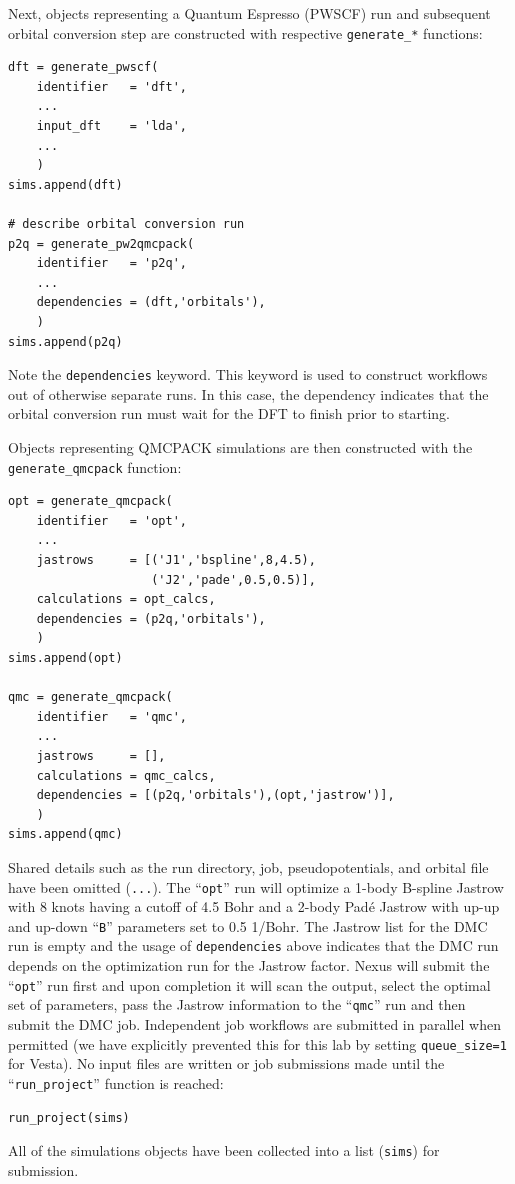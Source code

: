 Next, objects representing a Quantum Espresso (PWSCF) run and subsequent orbital conversion step are constructed with respective \texttt{generate\_*} functions:
\begin{lstlisting}
dft = generate_pwscf(
    identifier   = 'dft',
    ...
    input_dft    = 'lda',
    ...
    )
sims.append(dft)

# describe orbital conversion run                                                                    
p2q = generate_pw2qmcpack(
    identifier   = 'p2q',
    ...
    dependencies = (dft,'orbitals'),
    )
sims.append(p2q)
\end{lstlisting}
Note the \texttt{dependencies} keyword.  This keyword is used to construct workflows out of otherwise separate runs.  In this case, the dependency indicates that the orbital conversion run must wait for the DFT to finish prior to starting.

Objects representing QMCPACK simulations are then constructed with the \texttt{generate\_qmcpack} function:
\begin{lstlisting}
opt = generate_qmcpack(
    identifier   = 'opt',
    ...
    jastrows     = [('J1','bspline',8,4.5), 
                    ('J2','pade',0.5,0.5)],
    calculations = opt_calcs,
    dependencies = (p2q,'orbitals'),
    )
sims.append(opt)

qmc = generate_qmcpack(
    identifier   = 'qmc',
    ...
    jastrows     = [],            
    calculations = qmc_calcs,
    dependencies = [(p2q,'orbitals'),(opt,'jastrow')],
    )
sims.append(qmc)
\end{lstlisting}
\noindent
Shared details such as the run directory, job, pseudopotentials, and orbital file have been omitted (\texttt{...}).  The ``\texttt{opt}'' run will optimize a 1-body B-spline Jastrow with 8 knots having a cutoff of 4.5 Bohr and a 2-body Pad\'{e} Jastrow with up-up and up-down ``\texttt{B}'' parameters set to 0.5 1/Bohr.  The Jastrow list for the DMC run is empty and the usage of \texttt{dependencies} above indicates that the DMC run depends on the optimization run for the Jastrow factor.  Nexus will submit the ``\texttt{opt}'' run first and upon completion it will scan the output, select the optimal set of parameters, pass the Jastrow information to the ``\texttt{qmc}'' run and then submit the DMC job.  Independent job workflows are submitted in parallel when permitted (we have explicitly prevented this for this lab by setting \texttt{queue\_size=1} for Vesta).  No input files are written or job submissions made until the ``\texttt{run\_project}'' function is reached:
\begin{lstlisting}
run_project(sims)
\end{lstlisting}
\noindent
All of the simulations objects have been collected into a list (\texttt{sims}) for submission.


